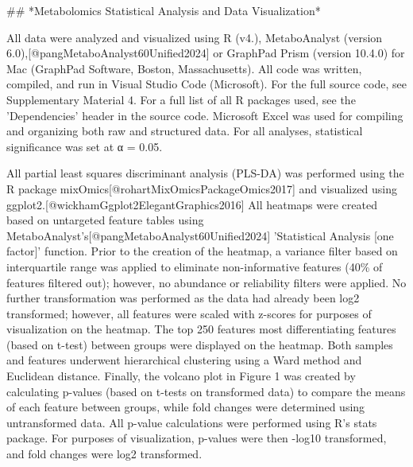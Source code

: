 ## *Metabolomics Statistical Analysis and Data Visualization*

All data were analyzed and visualized using R (v4.), MetaboAnalyst (version 6.0),[@pangMetaboAnalyst60Unified2024] or GraphPad Prism (version 10.4.0) for Mac (GraphPad Software, Boston, Massachusetts). All code was written, compiled, and run in Visual Studio Code (Microsoft). For the full source code, see Supplementary Material 4. For a full list of all R packages used, see the 'Dependencies' header in the source code. Microsoft Excel was used for compiling and organizing both raw and structured data. For all analyses, statistical significance was set at α = 0.05.

All partial least squares discriminant analysis (PLS-DA) was performed using the R package mixOmics[@rohartMixOmicsPackageOmics2017] and visualized using ggplot2.[@wickhamGgplot2ElegantGraphics2016] All heatmaps were created based on untargeted feature tables using MetaboAnalyst's[@pangMetaboAnalyst60Unified2024] 'Statistical Analysis [one factor]' function. Prior to the creation of the heatmap, a variance filter based on interquartile range was applied to eliminate non-informative features (40\% of features filtered out); however, no abundance or reliability filters were applied. No further transformation was performed as the data had already been log2 transformed; however, all features were scaled with z-scores for purposes of visualization on the heatmap. The top 250 features most differentiating features (based on t-test) between groups were displayed on the heatmap. Both samples and features underwent hierarchical clustering using a Ward method and Euclidean distance. Finally, the volcano plot in Figure 1 was created by calculating p-values (based on t-tests on transformed data) to compare the means of each feature between groups, while fold changes were determined using untransformed data. All p-value calculations were performed using R's stats package. For purposes of visualization, p-values were then -log10 transformed, and fold changes were log2 transformed.

